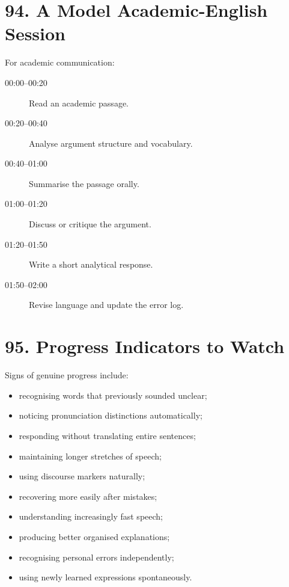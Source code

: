 \section*{94. A Model Academic-English Session}

For academic communication:

\begin{description}

    \item[00:00--00:20]
    Read an academic passage.

    \item[00:20--00:40]
    Analyse argument structure and vocabulary.

    \item[00:40--01:00]
    Summarise the passage orally.

    \item[01:00--01:20]
    Discuss or critique the argument.

    \item[01:20--01:50]
    Write a short analytical response.

    \item[01:50--02:00]
    Revise language and update the error log.

\end{description}

\section*{95. Progress Indicators to Watch}

Signs of genuine progress include:

\begin{itemize}
    \item recognising words that previously sounded unclear;
    \item noticing pronunciation distinctions automatically;
    \item responding without translating entire sentences;
    \item maintaining longer stretches of speech;
    \item using discourse markers naturally;
    \item recovering more easily after mistakes;
    \item understanding increasingly fast speech;
    \item producing better organised explanations;
    \item recognising personal errors independently;
    \item using newly learned expressions spontaneously.
\end{itemize}

